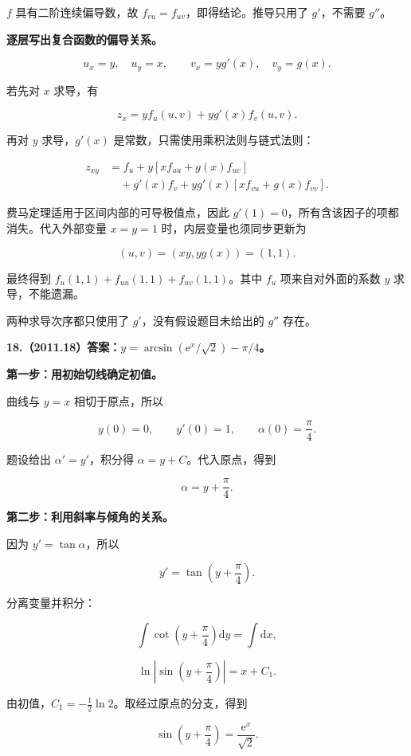 \documentclass[UTF8,11pt,fontset=windows]{ctexart}
\begin{document}
$f$ 具有二阶连续偏导数，故 $f_{vu}=f_{uv}$，即得结论。推导只用了 $g'$，不需要 $g''$。

\textbf{逐层写出复合函数的偏导关系。}

$$
u_x=y,\quad u_y=x,
\qquad v_x=yg'(x),\quad v_y=g(x).
$$

若先对 $x$ 求导，有

$$
z_x=yf_u(u,v)+yg'(x)f_v(u,v).
$$

再对 $y$ 求导，$g'(x)$ 是常数，只需使用乘积法则与链式法则：

$$
\begin{aligned}
z_{xy}
&=f_u+y[xf_{uu}+g(x)f_{uv}]\\
&\quad+g'(x)f_v
+yg'(x)[xf_{vu}+g(x)f_{vv}].
\end{aligned}
$$

费马定理适用于区间内部的可导极值点，因此 $g'(1)=0$，所有含该因子的项都消失。代入外部变量 $x=y=1$ 时，内层变量也须同步更新为

$$
(u,v)=(xy,yg(x))=(1,1).
$$

最终得到 $f_u(1,1)+f_{uu}(1,1)+f_{uv}(1,1)$。其中 $f_u$ 项来自对外面的系数 $y$ 求导，不能遗漏。

两种求导次序都只使用了 $g'$，没有假设题目未给出的 $g''$ 存在。

\clearpage

\textbf{18.（2011.18）答案：$y=\arcsin(\mathrm e^x/\sqrt2)-\pi/4$。}

\textbf{第一步：用初始切线确定初值。}

曲线与 $y=x$ 相切于原点，所以

$$
y(0)=0,\qquad y'(0)=1,\qquad\alpha(0)=\frac\pi4.
$$

题设给出 $\alpha'=y'$，积分得 $\alpha=y+C$。代入原点，得到

$$
\alpha=y+\frac\pi4.
$$

\textbf{第二步：利用斜率与倾角的关系。}

因为 $y'=\tan\alpha$，所以

$$
y'=\tan\left(y+\frac\pi4\right).
$$

分离变量并积分：

$$
\int\cot\left(y+\frac\pi4\right)\mathrm dy=\int\mathrm dx,
$$

$$
\ln\left|\sin\left(y+\frac\pi4\right)\right|=x+C_1.
$$

由初值，$C_1=-\frac12\ln2$。取经过原点的分支，得到

$$
\sin\left(y+\frac\pi4\right)=\frac{\mathrm e^x}{\sqrt2}.
$$
\end{document}
